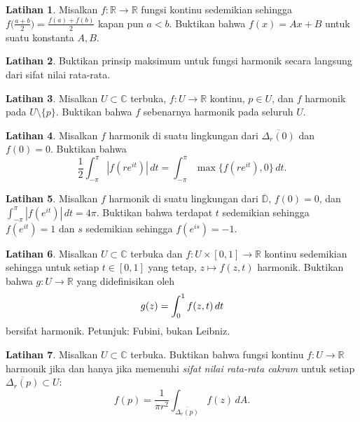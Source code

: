 \documentclass[12pt,openany]{book}
\newcommand{\avoidbreak}{\postdisplaypenalty=100}
\newcommand{\abs}[1]{\left\lvert {#1} \right\rvert}
\newcommand{\C}{{\mathbb{C}}}
\newcommand{\R}{{\mathbb{R}}}
\newcommand{\D}{{\mathbb{D}}}
\newcommand{\myindex}[1]{#1\index{#1}}
\theoremstyle{plain}
\theoremstyle{remark}
\theoremstyle{definition}
\newenvironment{exbox}{%
    \def\FrameCommand{\vrule width 1pt \relax\hspace{10pt}}%
    \MakeFramed{\advance\hsize-\width\FrameRestore}%
}{%
    \endMakeFramed
}
\theoremstyle{exercise}
\newtheorem{exercise}{Latihan}[section]
\theoremstyle{example}
\begin{document}
\begin{exbox}
\begin{exercise}
Misalkan $f \colon \R \to \R$ fungsi kontinu sedemikian sehingga
$f\bigl(\frac{a+b}{2}\bigr) = \frac{f(a)+f(b)}{2}$ kapan pun $a < b$.
Buktikan bahwa $f(x) = Ax + B$ untuk suatu konstanta $A,B$.
\end{exercise}

\begin{exercise}
Buktikan prinsip maksimum untuk fungsi harmonik secara langsung dari
sifat nilai rata-rata.
\end{exercise}

\begin{exercise}
Misalkan $U \subset \C$ terbuka, $f \colon U \to \R$ kontinu, $p \in U$,
dan $f$ harmonik pada $U \setminus \{ p \}$.  Buktikan bahwa $f$ sebenarnya
harmonik pada seluruh $U$.
\end{exercise}

\begin{exercise}
Misalkan $f$ harmonik di suatu lingkungan dari
$\overline{\Delta_r(0)}$ dan
$f(0) = 0$.  Buktikan bahwa
\begin{equation*}
\frac{1}{2} \int_{-\pi}^\pi \abs{f(re^{it})} \, dt = 
\int_{-\pi}^\pi \max \{ f(re^{it}), 0 \} \, dt .
\end{equation*}
\end{exercise}

\begin{exercise}
Misalkan $f$ harmonik di suatu lingkungan dari
$\overline{\D}$, $f(0) = 0$, dan $\int_{-\pi}^\pi \abs{f(e^{it})}\, dt =
4\pi$.
Buktikan bahwa terdapat $t$ sedemikian sehingga $f(e^{it}) = 1$ dan $s$ sedemikian sehingga
$f(e^{is}) = -1$.
\end{exercise}

\begin{exercise}
Misalkan $U \subset \C$ terbuka dan
$f \colon U \times [0,1] \to \R$ kontinu
sedemikian sehingga untuk setiap $t \in [0,1]$ yang tetap, $z \mapsto f(z,t)$ harmonik.
Buktikan bahwa $g \colon U \to \R$ yang didefinisikan oleh
\begin{equation*}
g(z) = \int_0^1 f(z,t) \, dt
\avoidbreak
\end{equation*}
bersifat harmonik.  Petunjuk: Fubini, bukan Leibniz.
\end{exercise}

\begin{exercise}
Misalkan $U \subset \C$ terbuka.
Buktikan bahwa fungsi kontinu $f \colon U \to \R$
harmonik jika dan hanya jika memenuhi
\emph{\myindex{sifat nilai rata-rata cakram}} untuk setiap $\overline{\Delta_r(p)}
\subset U$:
\begin{equation*}
f(p) = 
\frac{1}{\pi r^2} \int_{\overline{\Delta_r(p)}} f(z) \, dA.
\end{equation*}
\end{exercise}


\end{exbox}
\end{document}
